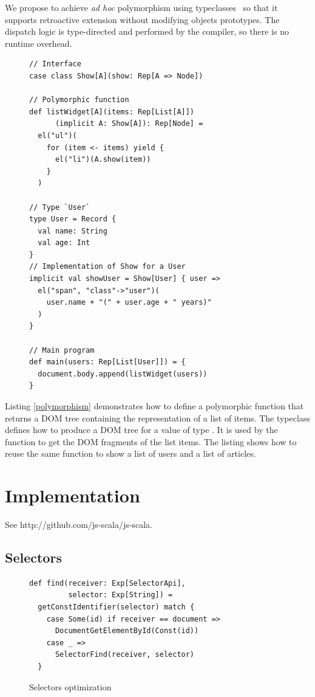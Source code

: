 \documentclass[preprint]{sigplanconf}
\begin{document}
We propose to achieve \emph{ad hoc} polymorphism using
typeclasses~\cite{Wadler89_AdhocPolymorphism,Odersky06_Typeclasses,Oliveira10_Typeclasses} so that it supports
retroactive extension without modifying objects prototypes. The dispatch logic is type-directed and performed by the
compiler, so there is no runtime overhead.

\begin{figure}
\begin{lstlisting}[label=polymorphism,caption=Ad hoc polymorphism using typeclasses]
// Interface
case class Show[A](show: Rep[A => Node])

// Polymorphic function
def listWidget[A](items: Rep[List[A]])
      (implicit A: Show[A]): Rep[Node] =
  el("ul")(
    for (item <- items) yield {
      el("li")(A.show(item))
    }
  )

// Type `User`
type User = Record {
  val name: String
  val age: Int
}
// Implementation of Show for a User
implicit val showUser = Show[User] { user =>
  el("span", "class"->"user")(
    user.name + "(" + user.age + " years)"
  )
}

// Main program
def main(users: Rep[List[User]]) = {
  document.body.append(listWidget(users))
}
\end{lstlisting}
\end{figure}

Listing \ref{polymorphism} demonstrates how to define a polymorphic  function that returns a DOM
tree containing the representation of a list of items. The  typeclass defines how to produce a DOM tree
for a value of type . It is used by the  function to get the DOM fragments of the list
items. The listing shows how to reuse the same  function to show a list of users and a list of
articles.

\section{Implementation}
\label{implementation}

See http://github.com/js-scala/js-scala.

\subsection{Selectors}

\begin{figure}
\label{selector-impl}
\begin{lstlisting}
def find(receiver: Exp[SelectorApi],
         selector: Exp[String]) =
  getConstIdentifier(selector) match {
    case Some(id) if receiver == document =>
      DocumentGetElementById(Const(id))
    case _ =>
      SelectorFind(receiver, selector)
  }
\end{lstlisting}
\caption{Selectors optimization}
\end{figure}
\end{document}
